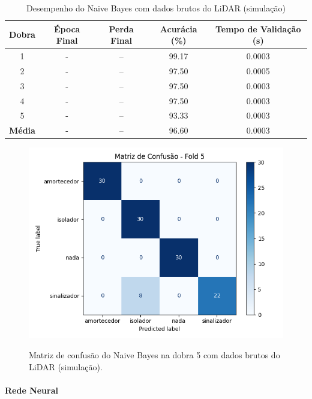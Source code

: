 \begin{table}[H]
\centering
\caption{Desempenho do Naive Bayes com dados brutos do LiDAR (simulação)}
\label{tab:naive_lidar_bruto}
\begin{tabular}{ccccc}
\hline
\textbf{Dobra} & \textbf{Época Final} & \textbf{Perda Final} & \textbf{Acurácia (\%)} & \textbf{Tempo de Validação (s)} \\
\hline
1 & - & --      & 99.17 & 0.0003 \\
2 & - & --      & 97.50 & 0.0005 \\
3 & - & --      & 97.50 & 0.0003 \\
4 & - & --      & 97.50 & 0.0003 \\
5 & - & --      & 93.33 & 0.0003 \\
\hline
\textbf{Média} & - & -- & 96.60 & 0.0003 \\
\hline
\end{tabular} \fonte{}
\end{table}

\begin{figure}[H]
\caption{Matriz de confusão do Naive Bayes na dobra 5 com dados brutos do LiDAR (simulação).}
\includegraphics[width=0.7\linewidth]{figuras/Resultados/simu_principal_Teste2_naive.png}
\fonte{}
\label{fig:matriz_confusao_naive_lidar_bruto}
\end{figure}


\paragraph{Rede Neural}

